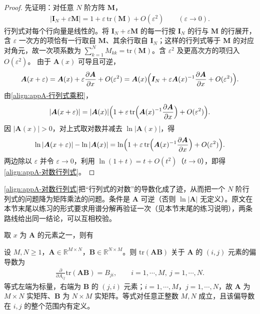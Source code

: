 \documentclass[../main.tex]{subfiles}
\begin{document}
\begin{proof}
先证明：对任意 $N$ 阶方阵 $\bm{M}$，
\begin{align*}
 |\bm{I}_{N}+\varepsilon\bm{M}|=1+\varepsilon\,\mathrm{tr}(\bm{M})+O(\varepsilon^{2})\qquad(\varepsilon\to0).
\end{align*}
行列式对每个行向量是线性的。将 $\bm{I}_{N}+\varepsilon\bm{M}$ 的每一行按 $\bm{I}_{N}$ 的行与 $\bm{M}$ 的行展开，含 $\varepsilon$ 一次方的项恰有一行取自 $\bm{M}$、其余行取自 $\bm{I}_{N}$；这样的行列式等于 $\bm{M}$ 的对应对角元，故一次项系数为 $\sum_{k=1}^{N}M_{kk}=\mathrm{tr}(\bm{M})$。含 $\varepsilon^{2}$ 及更高次方的项归入 $O(\varepsilon^{2})$。
由于 $\bm{A}(x)$ 可导且可逆，
\begin{align*}
 \bm{A}(x+\varepsilon)=\bm{A}(x)+\varepsilon\frac{\partial\bm{A}}{\partial x}+O(\varepsilon^{2})=\bm{A}(x)\Bigl(\bm{I}_{N}+\varepsilon\bm{A}(x)^{-1}\frac{\partial\bm{A}}{\partial x}+O(\varepsilon^{2})\Bigr).
\end{align*}
由\eqref{align:appA-行列式乘积}，
\begin{align*}
 |\bm{A}(x+\varepsilon)|=|\bm{A}(x)|\Bigl(1+\varepsilon\,\mathrm{tr}\Bigl(\bm{A}(x)^{-1}\frac{\partial\bm{A}}{\partial x}\Bigr)+O(\varepsilon^{2})\Bigr).
\end{align*}
因 $|\bm{A}(x)|>0$，对上式取对数并减去 $\ln|\bm{A}(x)|$，得
\begin{align*}
 \ln|\bm{A}(x+\varepsilon)|-\ln|\bm{A}(x)|=\ln\Bigl(1+\varepsilon\,\mathrm{tr}\Bigl(\bm{A}(x)^{-1}\frac{\partial\bm{A}}{\partial x}\Bigr)+O(\varepsilon^{2})\Bigr).
\end{align*}
两边除以 $\varepsilon$ 并令 $\varepsilon\to0$，利用 $\ln(1+t)=t+O(t^{2})$（$t\to0$），即得\eqref{align:appA-对数行列式}。
\end{proof}

\begin{remark}
\eqref{align:appA-对数行列式}把“行列式的对数”的导数化成了迹，从而把一个 $N$ 阶行列式的问题降为矩阵乘法的问题。条件是 $\bm{A}$ 可逆（否则 $\ln|\bm{A}|$ 无定义）。原文在本节末尾以练习的形式要求用谱分解再验证一次（见本节末尾的练习说明），两条路线给出同一结论，可以互相校验。
\end{remark}

取 $x$ 为 $\bm{A}$ 的元素之一，则有
\begin{proposition}[迹关于矩阵元素的导数]\label{proposition:appA-迹的矩阵导数}
设 $M,N\geqslant1$，$\bm{A}\in\mathbb{R}^{M\times N}$，$\bm{B}\in\mathbb{R}^{N\times M}$。则 $\mathrm{tr}(\bm{A}\bm{B})$ 关于 $\bm{A}$ 的 $(i,j)$ 元素的偏导数为
\begin{align}
  \frac{\partial}{\partial A_{ij}}\mathrm{tr}(\bm{A}\bm{B})=B_{ji},\qquad i=1,\cdots,M,\ j=1,\cdots,N.
  \label{align:appA-迹元素导数}
\end{align}
等式左端为标量，右端为 $\bm{B}$ 的 $(j,i)$ 元素；$i=1,\cdots,M$，$j=1,\cdots,N$，故 $\bm{A}$ 为 $M\times N$ 实矩阵、$\bm{B}$ 为 $N\times M$ 实矩阵。等式对任意正整数 $M,N$ 成立，且该偏导数在 $i,j$ 的整个范围内有定义。
\end{proposition}
\end{document}
